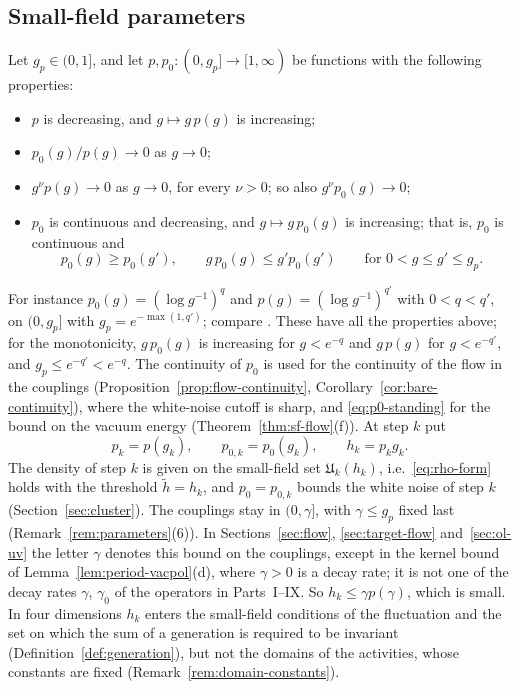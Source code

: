 \subsection{Small-field parameters}\label{subsec:flow-parameters}

Let $g_p\in(0,1]$, and let $p,p_0:(0,g_p]\to[1,\infty)$ be functions with the following properties:
\begin{itemize}
\item $p$ is decreasing, and $g\mapsto g\,p(g)$ is increasing;
\item $p_0(g)/p(g)\to0$ as $g\to0$;
\item $g^\nu p(g)\to0$ as $g\to0$, for every $\nu>0$; so also $g^\nu p_0(g)\to0$;
\item $p_0$ is continuous and decreasing, and $g\mapsto g\,p_0(g)$ is increasing; that is, $p_0$ is continuous and
\begin{equation}\label{eq:p0-standing}
p_0(g)\ge p_0(g'),\qquad g\,p_0(g)\le g'p_0(g')\qquad\text{for }0<g\le g'\le g_p .
\end{equation}
\end{itemize}
For instance $p_0(g)=(\log g^{-1})^q$ and $p(g)=(\log g^{-1})^{q'}$ with $0<q<q'$, on $(0,g_p]$ with $g_p=e^{-\max(1,q')}$; compare \cite{DimockI}. These have all the properties above; for the monotonicity, $g\,p_0(g)$ is increasing for $g<e^{-q}$ and $g\,p(g)$ for $g<e^{-q'}$, and $g_p\le e^{-q'}<e^{-q}$. The continuity of $p_0$ is used for the continuity of the flow in the couplings (Proposition~\ref{prop:flow-continuity}, Corollary~\ref{cor:bare-continuity}), where the white-noise cutoff is sharp, and \eqref{eq:p0-standing} for the bound on the vacuum energy (Theorem~\ref{thm:sf-flow}(f)). At step $k$ put
\[
p_k=p(g_k),\qquad p_{0,k}=p_0(g_k),\qquad h_k=p_kg_k .
\]
The density of step $k$ is given on the small-field set $\mathfrak U_k(h_k)$, i.e.\ \eqref{eq:rho-form} holds with the threshold $\tilde h=h_k$, and $p_0=p_{0,k}$ bounds the white noise of step $k$ (Section~\ref{sec:cluster}). The couplings stay in $(0,\gamma]$, with $\gamma\le g_p$ fixed last (Remark~\ref{rem:parameters}(6)). In Sections~\ref{sec:flow}, \ref{sec:target-flow} and~\ref{sec:ol-uv} the letter $\gamma$ denotes this bound on the couplings, except in the kernel bound of Lemma~\ref{lem:period-vacpol}(d), where $\gamma>0$ is a decay rate; it is not one of the decay rates $\gamma$, $\gamma_0$ of the operators in Parts~I--IX. So $h_k\le\gamma p(\gamma)$, which is small. In four dimensions $h_k$ enters the small-field conditions of the fluctuation and the set on which the sum of a generation is required to be invariant (Definition~\ref{def:generation}), but not the domains of the activities, whose constants are fixed (Remark~\ref{rem:domain-constants}).

